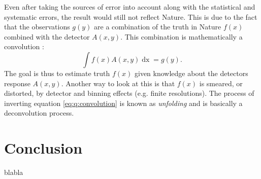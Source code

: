 Even after taking the sources of error into account along with the statistical and systematic errors, the result would still not reflect Nature. This is due to the fact that the observations $g(y)$ are a combination of the truth in Nature $f(x)$ combined with the detector $A(x, y)$. This combination is mathematically a convolution \autocite{schmittDataUnfoldingMethods2017}: 
\begin{equation}
  \label{eq:q:convolution}
  \int f(x) A(x, y) \mathop{dx} = g(y).
\end{equation}
The goal is thus to estimate truth $f(x)$ given knowledge about the detectors response $A(x,y)$. Another way to look at this is that $f(x)$ is smeared, or distorted, by detector and binning effects (e.g. finite resolutions). The process of inverting equation \eqref{eq:q:convolution} is known as \emph{unfolding} and is basically a deconvolution process.

\section{Conclusion}
\label{sec:q:conclusion}

blabla